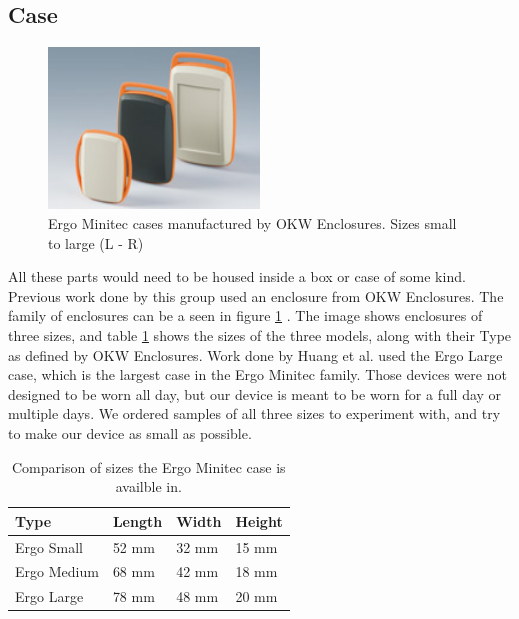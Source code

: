 \subsection{Case}
\label{Sec:Case}
\begin{figure}
\begin{center}
\includegraphics[width=0.5\textwidth]{images/OKWEN.jpg}
\caption{Ergo Minitec cases manufactured by OKW Enclosures. Sizes small to large (L - R)}
\label{Fig:OKWFam}
\end{center}
\end{figure}
All these parts would need to be housed inside a box or case of some kind.
Previous work done by this group used an enclosure from OKW Enclosures.
The family of enclosures can be a seen in figure \ref{Fig:OKWFam} \cite{Web:OKWPics}.
The image shows enclosures of three sizes,
and table \ref{Tab:OKWSize} shows the sizes of the three models,
along with their Type as defined by OKW Enclosures.
Work done by Huang et al. \cite{huang2013assessment} used the Ergo Large case,
which is the largest case in the Ergo Minitec family.
Those devices were not designed to be worn all day,
but our device is meant to be worn for a full day or multiple days.
We ordered samples of all three sizes to experiment with,
and try to make our device as small as possible.
\begin{table}[h]
\centering
\begin{tabular}{@{}llll@{}}
\toprule
Type & Length & Width & Height \\ \midrule
Ergo Small   & 52 mm  & 32 mm & 15 mm  \\
Ergo Medium   & 68 mm  & 42 mm & 18 mm  \\
Ergo Large   & 78 mm  & 48 mm & 20 mm  \\ \bottomrule
\end{tabular}
\caption{Comparison of sizes the Ergo Minitec case is availble in.}
\label{Tab:OKWSize}
\end{table}


